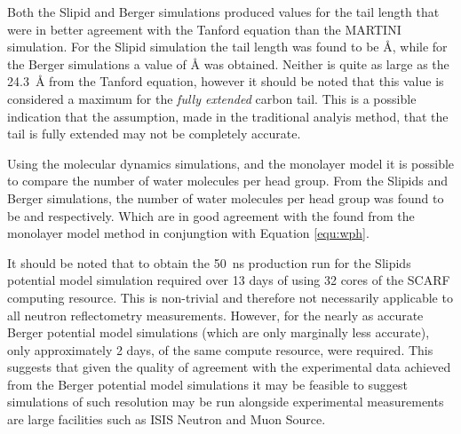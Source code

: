 \documentclass[amsmath,amssymb,twocolumn,superscriptaddress]{revtex4-1}
\begin{document}
Both the Slipid and Berger simulations produced values for the tail length that were in better agreement with the Tanford equation than the MARTINI simulation.
For the Slipid simulation the tail length was found to be \si{\angstrom}, while for the Berger simulations a value of \si{\angstrom} was obtained.
Neither is quite as large as the \SI{24.3}{\angstrom} from the Tanford equation, however it should be noted that this value is considered a maximum for the \emph{fully extended} carbon tail.
This is a possible indication that the assumption, made in the traditional analyis method, that the tail is fully extended may not be completely accurate.

Using the molecular dynamics simulations, and the monolayer model it is possible to compare the number of water molecules per head group.
From the Slipids and Berger simulations, the number of water molecules per head group was found to be  and  respectively.
Which are in good agreement with the  found from the monolayer model method in conjungtion with Equation \ref{equ:wph}.

It should be noted that to obtain the \SI{50}{\nano\second} production run for the Slipids potential model simulation required over 13 days of using 32 cores of the SCARF computing resource.
This is non-trivial and therefore not necessarily applicable to all neutron reflectometry measurements.
However, for the nearly as accurate Berger potential model simulations (which are only marginally less accurate), only approximately 2 days, of the same compute resource, were required.
This suggests that given the quality of agreement with the experimental data achieved from the Berger potential model simulations it may be feasible to suggest simulations of such resolution may be run alongside experimental measurements are large facilities such as ISIS Neutron and Muon Source.
\end{document}
